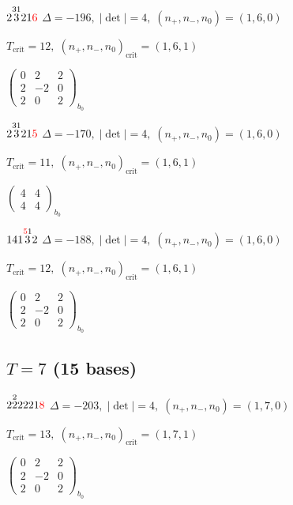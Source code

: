 \documentclass[10pt]{article}
\begin{document}
$2\overset{31}{3}21\textcolor{red}{6}$ \quad $\Delta=-196,\; |\det|=4,\; (n_+,n_-,n_0)=(1,6,0)$

\hspace{1em}$T_{\text{crit}}=12,\; (n_+,n_-,n_0)_{\text{crit}}=(1,6,1)$

\hspace{2em}$\left(\begin{smallmatrix}0 & 2 & 2 \\ 2 & -2 & 0 \\ 2 & 0 & 2\end{smallmatrix}\right)_{\!b_0}$

$2\overset{31}{3}21\textcolor{red}{5}$ \quad $\Delta=-170,\; |\det|=4,\; (n_+,n_-,n_0)=(1,6,0)$

\hspace{1em}$T_{\text{crit}}=11,\; (n_+,n_-,n_0)_{\text{crit}}=(1,6,1)$

\hspace{2em}$\left(\begin{smallmatrix}4 & 4 \\ 4 & 4\end{smallmatrix}\right)_{\!b_0}$

\smallskip

$141\overset{\textcolor{red}{5}1}{3}2$ \quad $\Delta=-188,\; |\det|=4,\; (n_+,n_-,n_0)=(1,6,0)$

\hspace{1em}$T_{\text{crit}}=12,\; (n_+,n_-,n_0)_{\text{crit}}=(1,6,1)$

\hspace{2em}$\left(\begin{smallmatrix}0 & 2 & 2 \\ 2 & -2 & 0 \\ 2 & 0 & 2\end{smallmatrix}\right)_{\!b_0}$


\subsection*{$T = 7$ \quad (15 bases)}
\smallskip

$2\overset{2}{2}2221\textcolor{red}{8}$ \quad $\Delta=-203,\; |\det|=4,\; (n_+,n_-,n_0)=(1,7,0)$

\hspace{1em}$T_{\text{crit}}=13,\; (n_+,n_-,n_0)_{\text{crit}}=(1,7,1)$

\hspace{2em}$\left(\begin{smallmatrix}0 & 2 & 2 \\ 2 & -2 & 0 \\ 2 & 0 & 2\end{smallmatrix}\right)_{\!b_0}$
\end{document}
